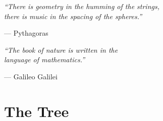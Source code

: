 \documentclass[11pt,openright,twoside]{book}
\begin{document}
\thispagestyle{empty}
\vspace*{2.5in}
\begin{center}
\begin{minipage}{0.65\textwidth}
\begin{center}
\Large\itshape
``There is geometry in the humming of the strings,\\
there is music in the spacing of the spheres.''
\end{center}
\begin{flushright}
\normalsize --- Pythagoras
\end{flushright}

\vspace{1in}

\begin{center}
\Large\itshape
``The book of nature is written in the\\
language of mathematics.''
\end{center}
\begin{flushright}
\normalsize --- Galileo Galilei
\end{flushright}
\end{minipage}
\end{center}
\vfill
\cleardoublepage

\tableofcontents
\cleardoublepage


\mainmatter


\cleardoublepage

\part{The Tree}
\label{part:tree}

\cleardoublepage
\cleardoublepage
\cleardoublepage
\cleardoublepage

\end{document}
